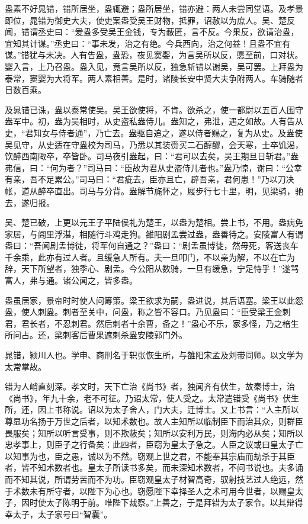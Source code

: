 \documentclass[]{article}
\begin{document}
盎素不好晁错，错所居坐，盎辄避；盎所居坐，错亦避：两人未尝同堂语。及孝景即位，晁错为御史大夫，使吏案盎受吴王财物，抵罪，诏赦以为庶人。吴、楚反闻，错谓丞史曰：``爰盎多受吴王金钱，专为蔽匿，言不反。今果反，欲请治盎，宜知其计谋。''丞史曰：``事未发，治之有绝。今兵西向，治之何益！且盎不宜有谋。''错犹与未决。人有告盎，盎恐，夜见窦婴，为言吴所以反，愿至前，口对状。婴入言，上乃召盎。盎入见，竟言吴所以反，独急斩错以谢吴，吴可罢。上拜盎为泰常，窦婴为大将军。两人素相善。是时，诸陵长安中贤大夫争附两人。车骑随者日数百乘。

及晁错已诛，盎以泰常使吴。吴王欲使将，不肯。欲杀之，使一都尉以五百人围守盎军中。初，盎为吴相时，从史盗私盎侍儿。盎知之，弗泄，遇之如故。人有告从史，``君知女与侍者通''，乃亡去。盎驱自追之，遂以侍者赐之，复为从史。及盎使吴见守，从史适在守盎校为司马，乃悉以其装赍买二石醇醪，会天寒，士卒饥渴，饮醉西南陬卒，卒皆卧。司马夜引盎起，曰：``君可以去矣，吴王期旦日斩君。''盎弗信，曰：``何为者？''司马曰：``臣故为君从史盗侍儿者也。''盎乃惊，谢曰：``公幸有亲，吾不足累公。''司马曰：``君疵去，臣亦且亡，辟吾亲，君何患！''乃以刀决帐，道从醉卒直出。司马与分背。盎解节旄怀之，屐步行七十里，明，见梁骑，驰去，遂归报。

吴、楚已破，上更以元王子平陆侯礼为楚王，以盎为楚相。尝上书，不用。盎病免家居，与闾里浮湛，相随行斗鸡走狗。雒阳剧孟尝过盎，盎善待之。安陵富人有谓盎曰：``吾闻剧孟博徒，将军何自通之？''盎曰：``剧孟虽博徒，然母死，客送丧车千余乘，此亦有过人者。且缓急人所有。夫一旦叩门，不以亲为解，不以在亡为辞，天下所望者，独季心、剧孟。今公阳从数骑，一旦有缓急，宁足恃乎！''遂骂富人，弗与通。诸公闻之，皆多盎。

盎虽居家，景帝时时使人问筹策。梁王欲求为嗣，盎进说，其后语塞。梁王以此怨盎，使人刺盎。刺者至关中，问盎，称之皆不容口。乃见盎曰：``臣受梁王金刺君，君长者，不忍刺君。然后刺者十余曹，备之！''盎心不乐，家多怪，乃之棓生所问占。还，梁刺客后曹果遮刺杀盎安陵郭门外。

晁错，颍川人也。学申、商刑名于轵张恢生所，与雒阳宋孟及刘带同师。以文学为太常掌故。

错为人峭直刻深。孝文时，天下亡治《尚书》者，独闻齐有伏生，故秦博士，治《尚书》，年九十余，老不可征。乃诏太常，使人受之。太常遣错受《尚书》伏生所，还，因上书称说。诏以为太子舍人，门大夫，迁博士。又上书言：``人主所以尊显功名扬于万世之后者，以知术数也。故人主知所以临制臣下而治其众，则群臣畏服矣；知所以听言受事，则不欺蔽矣；知所以安利万民，则海内必从矣；知所以忠孝事上，则臣子之行备矣：此四者，臣窃为皇太子急之。人臣之议或曰皇太子亡以知事为也，臣之愚，诚以为不然。窃观上世之君，不能奉其宗庙而劫杀于其臣者，皆不知术数者也。皇太子所读书多矣，而未深知术数者，不问书说也。夫多诵而不知其说，所谓劳苦而不为功。臣窃观皇太子材智高奇，驭射技艺过人绝远，然于术数未有所守者，以陛下为心也。窃愿陛下幸择圣人之术可用今世者，以赐皇太子，因时使太子陈明于前。唯陛下裁察。''上善之，于是拜错为太子家令。以其辩得幸太子，太子家号曰``智囊''。
\end{document}
